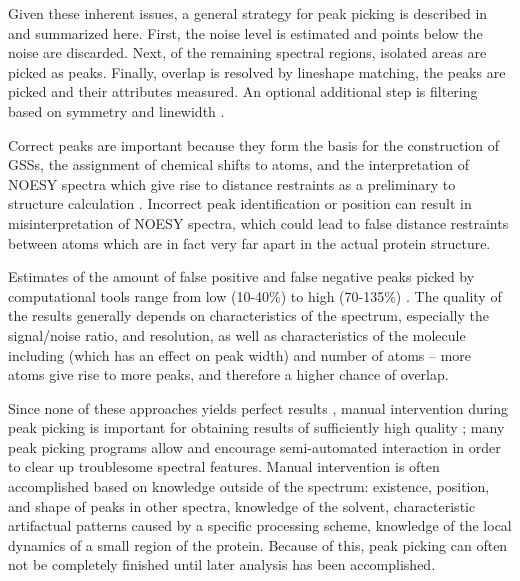 Given these inherent issues, a general strategy for peak picking is 
described in \cite{autopsy, picky} and summarized here.
First, the noise level is estimated and points below the noise are discarded.
Next, of the remaining spectral regions, isolated areas are picked as peaks.
Finally, overlap is resolved by lineshape matching, the peaks are picked
and their attributes measured.  An optional additional step is filtering
based on symmetry and linewidth \cite{autopsy, picky}.

Correct peaks are important because they form the basis for the construction 
of GSSs, the assignment of chemical shifts to atoms, and the interpretation of 
NOESY spectra which give rise to distance restraints as a preliminary to 
structure calculation \cite{guerry2011automated}.  
Incorrect peak identification or position can result 
in misinterpretation of NOESY spectra, which could lead to false distance 
restraints between atoms which are in fact very far apart in the actual 
protein structure.

Estimates of the amount of false positive and false negative peaks picked 
by computational tools range from low (10-40\%) to high (70-135\%) \cite{pine}. 
The quality of the results generally depends on characteristics of the 
spectrum, especially the signal/noise ratio, and resolution, as well as 
characteristics of the molecule including \mattfttwo{} (which has an 
effect on peak width) and number of atoms -- more atoms give rise to
more peaks, and therefore a higher chance of overlap.

Since none of these approaches yields perfect 
results \cite{guerry2011automated}, manual intervention during peak picking 
is important for obtaining results of sufficiently high quality
\cite{guntert2009automated}; many peak picking 
programs allow and encourage semi-automated interaction in order to clear 
up troublesome spectral features.  
Manual intervention is often accomplished based on knowledge outside of the 
spectrum: existence, position, and shape of peaks in other spectra, knowledge 
of the solvent, characteristic artifactual patterns caused by a specific 
processing scheme, knowledge of the local dynamics of a small region of the 
protein.  \cite{williamson2009automated, guntert2009automated, 
altieri2004automation, baran2004automated}
Because of this, peak picking can often not be completely finished until 
later analysis has been accomplished.

